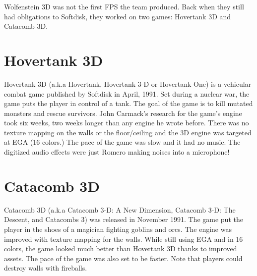 Wolfenstein 3D was not the first FPS the team produced. Back when they still had obligations to Softdisk, they worked on two games: Hovertank 3D and Catacomb 3D.\\
\par
\section{Hovertank 3D}
Hovertank 3D (a.k.a Hovertank, Hovertank 3-D or Hovertank One) is a vehicular combat game published by Softdisk in April, 1991. Set during a nuclear war, the game puts the player in control of a tank. The goal of the game is to kill mutated monsters and rescue survivors. John Carmack's research for the game's engine took six weeks, two weeks longer than any engine he wrote before. There was no texture mapping on the walls or the floor/ceiling and the 3D engine was targeted at EGA (16 colors.) The pace of the game was slow and it had no music. The digitized audio effects were just Romero making noises into a microphone! \\
\par

\section{Catacomb 3D}
Catacomb 3D (a.k.a Catacomb 3-D: A New Dimension, Catacomb 3-D: The Descent, and Catacombs 3) was released in November 1991. The game put the player in the shoes of a magician fighting goblins and orcs. The engine was improved with texture mapping for the walls. While still using EGA and in 16 colors, the game looked much better than Hovertank 3D thanks to improved assets. The pace of the game was also set to be faster. Note that players could destroy walls with fireballs.\\
\par
\begin{minipage}{\textwidth}
\label{hovertank3d_screenshot}
\begin{figure}[H]
\centering
{}
\end{figure}

\begin{figure}[H]
\centering
{}
\end{figure}
\end{minipage}


\begin{minipage}{\textwidth}
\label{catacomb3d_screenshot}
\begin{figure}[H]
\centering
{}
\end{figure}

\begin{figure}[H]
\centering
{}
\end{figure}
\end{minipage}

